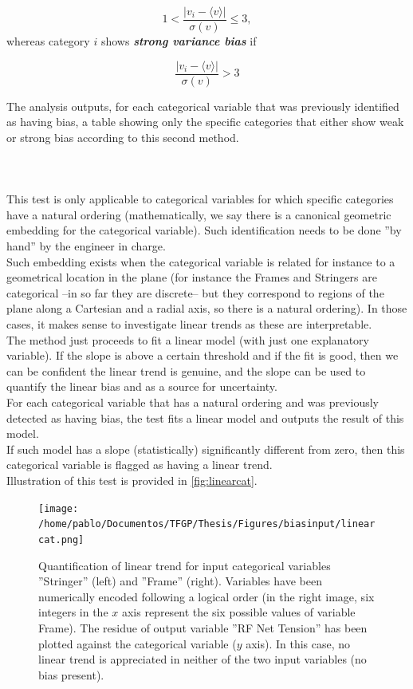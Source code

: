 $$1<\frac{|v_i-\langle v \rangle|}{\sigma(v)}\leq3,$$
whereas category $i$ shows \textit{\textbf{strong variance bias}} if 

$$\frac{|v_i-\langle v \rangle|}{\sigma(v)}>3$$

The analysis outputs, for each categorical variable that was previously identified as having bias, a table showing only the specific categories that either show weak or strong bias according to this second method.

\paragraph{ \\}
This test is only applicable to categorical variables for which specific categories have a natural ordering (mathematically, we say there is a canonical geometric embedding for the categorical variable). Such identification needs to be done ''by hand'' by the engineer in charge.\\
\indent Such embedding exists when the categorical variable is related for instance to a geometrical location in the plane (for instance the Frames and Stringers are categorical --in so far they are discrete-- but they correspond to regions of the plane along a Cartesian and a radial axis, so there is a natural ordering). In those cases, it makes sense to investigate linear trends as these are interpretable.\\
\indent The method just proceeds to fit a linear model (with just one explanatory variable). If the slope is above a certain threshold and if the fit is good, then we can be confident the linear trend is genuine, and the slope can be used to quantify the linear bias and as a source for uncertainty.\\
\indent For each categorical variable that has a natural ordering and was previously detected as having bias, the test fits a linear model and outputs the result of this model.\\
\indent If such model has a slope (statistically) significantly different from zero, then this categorical variable is flagged as having a linear trend.\\
%
\indent Illustration of this test is provided in \autoref{fig:linearcat}.
\begin{figure}[!htb]
	\centering
	\texttt{[image: /home/pablo/Documentos/TFGP/Thesis/Figures/biasinput/linearcat.png]}
	\caption{Quantification of linear trend for input categorical variables ''Stringer'' (left) and ''Frame'' (right). Variables have been numerically encoded following a logical order (\eg in the right image, six integers in the $x$ axis represent the six possible values of variable  Frame). The residue of output variable ''RF Net Tension'' has been plotted against the categorical variable ($y$ axis). In this case, no linear trend is appreciated in neither of the two input variables (no bias present).}
	\label{fig:linearcat}
\end{figure}
%
